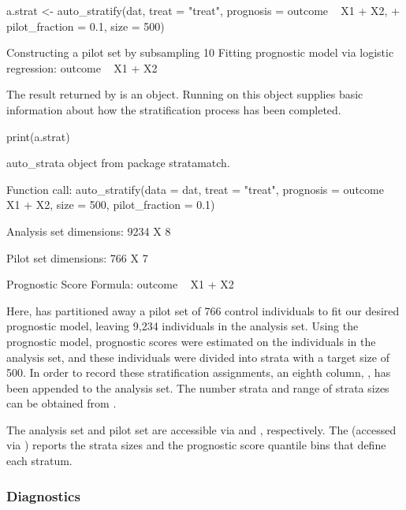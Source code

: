 \begin{example}
a.strat <- auto_stratify(dat, treat = "treat", prognosis = outcome ~ X1 + X2,
+    pilot_fraction = 0.1, size = 500)
\end{example}
\begin{example}
Constructing a pilot set by subsampling 10%
Fitting prognostic model via logistic regression: outcome ~ X1 + X2
\end{example}

The result returned by  is an  object.  Running  on this object supplies basic information about how the stratification process has been completed.

\begin{example}
print(a.strat)
\end{example}
\begin{example}
auto_strata object from package stratamatch.

Function call:
auto_stratify(data = dat, treat = "treat", prognosis = outcome ~ 
    X1 + X2, size = 500, pilot_fraction = 0.1)

Analysis set dimensions: 9234 X 8

Pilot set dimensions: 766 X 7

Prognostic Score Formula:
outcome ~ X1 + X2
\end{example}

Here,  has partitioned away a pilot set of 766 control individuals to fit our desired prognostic model, leaving 9,234 individuals in the analysis set.  Using the prognostic model, prognostic scores were estimated on the individuals in the analysis set, and these individuals were divided into strata with a target size of 500.  In order to record these stratification assignments, an eighth column, , has been appended to the analysis set.  The number strata and range of strata sizes can be obtained from .

The analysis set and pilot set are accessible via  and , respectively.  The  (accessed via ) reports the strata sizes and the prognostic score quantile bins that define each stratum.

\subsubsection{Diagnostics} \label{subsubsec:simulated_diagnostics}

